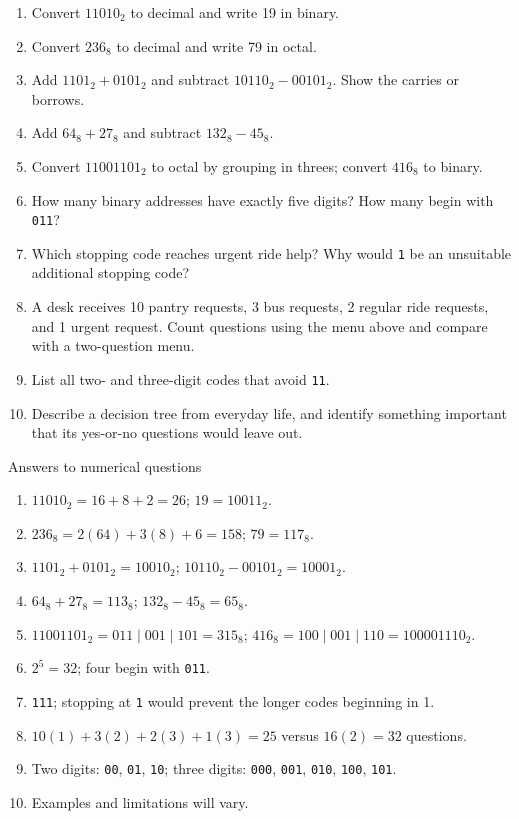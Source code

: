 \documentclass[10pt]{article}
\begin{document}
\begin{enumerate}
\item Convert $11010_2$ to decimal and write 19 in binary.
\item Convert $236_8$ to decimal and write 79 in octal.
\item Add $1101_2+0101_2$ and subtract $10110_2-00101_2$. Show the carries or borrows.
\item Add $64_8+27_8$ and subtract $132_8-45_8$.
\item Convert $11001101_2$ to octal by grouping in threes; convert $416_8$ to binary.
\item How many binary addresses have exactly five digits? How many begin with \texttt{011}?
\item Which stopping code reaches urgent ride help? Why would \texttt{1} be an unsuitable additional stopping code?
\item A desk receives 10 pantry requests, 3 bus requests, 2 regular ride requests, and 1 urgent request. Count questions using the menu above and compare with a two-question menu.
\item List all two- and three-digit codes that avoid \texttt{11}.
\item Describe a decision tree from everyday life, and identify something important that its yes-or-no questions would leave out.
\end{enumerate}
\begin{worked}{Answers to numerical questions}
\begin{enumerate}
\item $11010_2=16+8+2=26$; $19=10011_2$.
\item $236_8=2(64)+3(8)+6=158$; $79=117_8$.
\item $1101_2+0101_2=10010_2$; $10110_2-00101_2=10001_2$.
\item $64_8+27_8=113_8$; $132_8-45_8=65_8$.
\item $11001101_2=011\mid001\mid101=315_8$; $416_8=100\mid001\mid110=100001110_2$.
\item $2^5=32$; four begin with \texttt{011}.
\item \texttt{111}; stopping at \texttt{1} would prevent the longer codes beginning in 1.
\item $10(1)+3(2)+2(3)+1(3)=25$ versus $16(2)=32$ questions.
\item Two digits: \texttt{00}, \texttt{01}, \texttt{10}; three digits: \texttt{000}, \texttt{001}, \texttt{010}, \texttt{100}, \texttt{101}.
\item Examples and limitations will vary.
\end{enumerate}
\end{worked}
\end{document}
